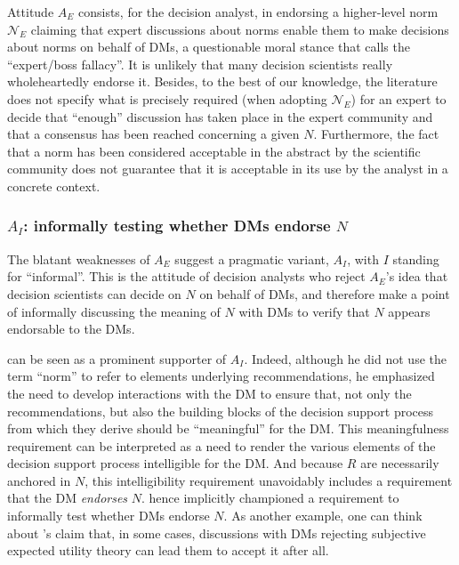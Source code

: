 \documentclass[preprint, french, english, 11pt, authoryear]{elsarticle}%
\newcommand{\protectforpdf}[1]{\texorpdfstring{\ensuremath{#1}}{#1}}
\newcommand{\possessivecite}[1]{\citeauthor{#1}’s \citeyearpar{#1}}
\begin{document}
Attitude $A_E$ consists, for the decision analyst, in endorsing a higher-level norm $\mathscr{N}_E$ claiming that expert discussions about norms enable them to make decisions about norms on behalf of \acp{DM}, a questionable moral stance that \citet{estlund_democratic_2009} calls the ``expert/boss fallacy''. 
It is unlikely that many decision scientists really wholeheartedly endorse it. 
Besides, to the best of our knowledge, the literature does not specify what is precisely required (when adopting  $\mathscr{N}_E$) for an expert to decide that “enough” discussion has taken place in the expert community and that a consensus has been reached concerning a given $N$. 
Furthermore, the fact that a norm has been considered acceptable in the abstract by the scientific community does not guarantee that it is acceptable in its use by the analyst in a concrete context.

\subsubsection{\texorpdfstring{$A_I$}{AI}: informally testing whether \aclp{DM} 
endorse \protectforpdf{N}}
The blatant weaknesses of $A_E$ suggest a pragmatic variant, $A_I$, with $I$ standing for “informal”. 
This is the attitude of decision analysts who reject $A_E$'s idea that decision scientists can decide on $N$ on behalf of \acp{DM}, and therefore make a point of informally discussing the meaning of $N$ with \acp{DM} to verify that %
$N$ appears endorsable to the \acp{DM}.%

\citet{roy_multicriteria_1996} can be seen as a prominent supporter of $A_I$. 
Indeed, although he did not use the term “norm” to refer to elements underlying recommendations, he emphasized the need to develop interactions with the \ac{DM}
 to ensure that, not only the recommendations, 
but also the building blocks of the decision support process from which they derive should be ``meaningful'' for the \ac{DM}. This meaningfulness requirement can be interpreted as a need to render the various elements of the decision support process intelligible for the \ac{DM}.
And because $R$ are necessarily anchored in $N$, this intelligibility requirement unavoidably includes a requirement that the \ac{DM}
 \emph{endorses} $N$. 
\citet{roy_multicriteria_1996} hence implicitly championed a requirement to informally test whether \acp{DM}
 endorse $N$. 
As another example, one can think about \possessivecite{raiffa_back_1985} claim that, in some cases, discussions with \acp{DM}
 rejecting subjective expected utility theory can lead them to accept it after all.
\end{document}
